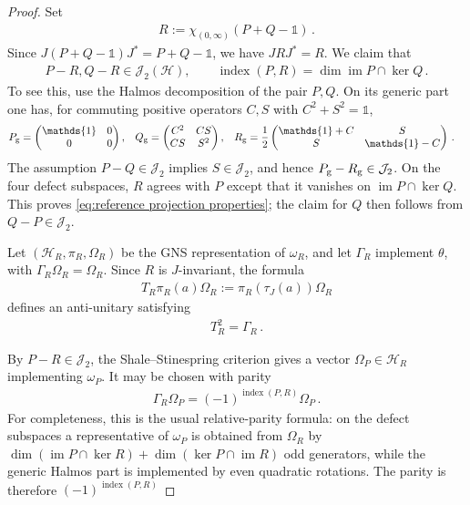 \documentclass[a4paper,10pt]{article}
\numberwithin{equation}{section}
\theoremstyle{plain}
\theoremstyle{plain}
\theoremstyle{plain}
\theoremstyle{plain}
\theoremstyle{plain}
\theoremstyle{remark}
\theoremstyle{definition}
\newcommand{\calH}{\mathcal{H}}
\newcommand{\calJ}{\mathcal{J}}
\newcommand{\Id}{\mathds{1}}
\newcommand{\im}{\operatorname{im}}
\newcommand{\eq}[1]{\begin{align*}#1\end{align*}}
\newcommand{\eql}[1]{\begin{align}#1\end{align}}
\newcommand{\br}[1]{\left(#1\right)}
\begin{document}
\begin{proof}
Set
\eql{
    R
    :=
    \chi_{(0,\infty)}\br{P+Q-\Id}
    \label{eq:Katsura Koma reference projection}\,.
}
Since $J(P+Q-\Id)J^*=P+Q-\Id$, we have $JRJ^*=R$. We claim that
\eql{
    P-R,Q-R\in\calJ_2(\calH),
    \qquad
    \operatorname{index}(P,R)
    =
    \dim\im P\cap\ker Q
    \label{eq:reference projection properties}\,.
}
To see this, use the Halmos decomposition of the pair $P,Q$. On its
generic part one has, for commuting positive operators $C,S$ with
$C^2+S^2=\Id$,
\eq{
    P_{\rm g}
    &=
    \begin{pmatrix}\Id&0\\0&0\end{pmatrix},
    &
    Q_{\rm g}
    &=
    \begin{pmatrix}C^2&CS\\CS&S^2\end{pmatrix},
    &
    R_{\rm g}
    &=
    \frac12
    \begin{pmatrix}\Id+C&S\\S&\Id-C\end{pmatrix}\,.
}
The assumption $P-Q\in\calJ_2$ implies $S\in\calJ_2$, and hence
$P_{\rm g}-R_{\rm g}\in\calJ_2$. On the four defect subspaces, $R$
agrees with $P$ except that it vanishes on $\im P\cap\ker Q$. This
proves \cref{eq:reference projection properties}; the claim for $Q$
then follows from $Q-P\in\calJ_2$.

Let $(\calH_R,\pi_R,\Omega_R)$ be the GNS representation of
$\omega_R$, and let $\Gamma_R$ implement $\theta$, with
$\Gamma_R\Omega_R=\Omega_R$. Since $R$ is $J$-invariant, the formula
\eq{
    T_R\pi_R(a)\Omega_R
    :=
    \pi_R(\tau_J(a))\Omega_R
}
defines an anti-unitary satisfying
\eql{
    T_R^2=\Gamma_R
    \label{eq:reference time reversal square}\,.
}

By $P-R\in\calJ_2$, the Shale--Stinespring criterion gives a vector
$\Omega_P\in\calH_R$ implementing $\omega_P$. It may be chosen with
parity
\eql{
    \Gamma_R\Omega_P
    =
    \br{-1}^{\operatorname{index}(P,R)}\Omega_P
    \label{eq:relative quasi free parity}\,.
}
For completeness, this is the usual relative-parity formula: on the
defect subspaces a representative of $\omega_P$ is obtained from
$\Omega_R$ by
$\dim(\im P\cap\ker R)+\dim(\ker P\cap\im R)$ odd generators, while
the generic Halmos part is implemented by even quadratic rotations.
The parity is therefore
$(-1)^{\operatorname{index}(P,R)}$


\end{proof}
\end{document}
